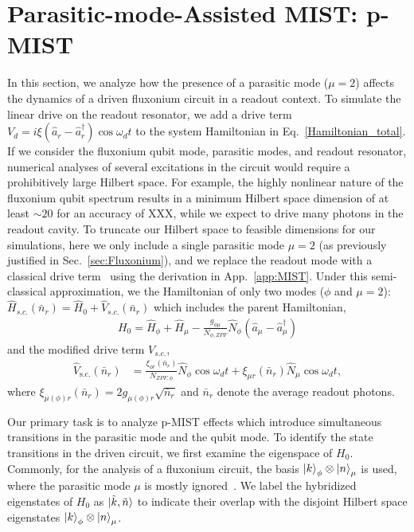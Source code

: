 \documentclass[prx,showpacs,notitlepage,twocolumn,superscriptaddress,nofootinbib,preprintnumbers,floatfix]{revtex4-2}
\begin{document}
\section{Parasitic-mode-Assisted MIST: p-MIST}\label{sec:MIST}

 In this section, we analyze how the presence of a parasitic mode ($\mu=2$) affects the dynamics of a driven fluxonium circuit in a readout context. To simulate the linear drive on the readout resonator, we add a drive term $V_d=i\xi (\hat a_r-\hat a_r^\dagger)\cos{\omega_d t}$ to the system Hamiltonian in Eq.~\ref{Hamiltonian_total}. If we consider the fluxonium qubit mode, parasitic modes, and readout resonator, numerical analyses of several excitations in the circuit would require a prohibitively large Hilbert space. For example, the highly nonlinear nature of the fluxonium qubit spectrum results in a minimum Hilbert space dimension of at least $\sim 20$ for an accuracy of XXX, while we expect to drive many photons in the readout cavity. To truncate our Hilbert space to feasible dimensions for our simulations, here we only include a single parasitic mode $\mu=2$ (as previously justified in Sec.~\ref{sec:Fluxonium}), and we replace the readout mode with a classical drive term~\cite{cohen2023reminiscence,dumas2024unified,xiao2023diagrammatic} using the derivation in App.~\ref{app:MIST}. Under this semi-classical approximation, we the Hamiltonian of only two modes ($\phi$ and $\mu=2$): $\hat H_{s.c.}(\bar n_r)=\hat H_0+\hat V_{s.c.}(\bar n_r)$ which 
includes the parent Hamiltonian,
\begin{align}
H_0=\hat H_\phi+\hat H_{\mu}-\frac{g_{\phi\mu}}{N_{\phi,ZPF}} \hat N_\phi (\hat a_{\mu}-\hat a_{\mu}^\dagger)    
\end{align}
and the modified drive term $V_{s.c.}$,
\begin{align}
    \hat V_\textrm{s.c.}(\bar n_r)&=\frac{\xi_{\phi r}(\bar n_r)}{N_{ZPF,\phi}} \hat N_\phi\cos{\omega_d t}+\xi_{\mu r}(\bar n_r) \hat N_\mu\cos{\omega_d t},\label{eq:drive}
\end{align}
where $\xi_{\mu(\phi) r}(\bar n_r)=2g_{\mu(\phi) r}\sqrt{\bar n_r}$ and $\bar n_r$ denote the average readout photons. 


Our primary task is to analyze p-MIST effects which introduce simultaneous transitions in the parasitic mode and the qubit mode. To identify the state transitions in the driven circuit, we first examine the eigenspace of $H_0$. Commonly, for the analysis of a fluxonium circuit, the basis $\ket{k}_{\phi} \otimes \ket{n}_{\mu}$ is used, where the parasitic mode $\mu$ is mostly ignored~\cite{nesterov2024measurement}. We label the hybridized eigenstates of $H_{\textrm{0}}$ as  $\ket{\tilde{k}, \tilde{n}}$ to indicate their overlap with the disjoint Hilbert space eigenstates $\ket{k}_\phi\otimes\ket{n}_\mu$. 
\end{document}
